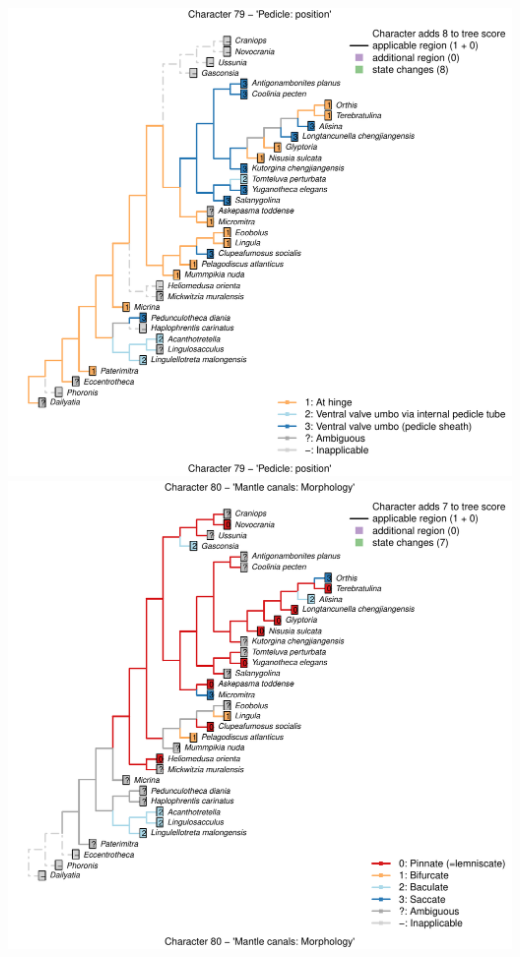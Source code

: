 \documentclass[]{book}
\theoremstyle{definition}
\theoremstyle{definition}
\theoremstyle{definition}
\theoremstyle{remark}
\begin{document}
\includegraphics{Brachiopod_phylogeny_files/figure-latex/unnamed-chunk-4-79.pdf}
\includegraphics{Brachiopod_phylogeny_files/figure-latex/unnamed-chunk-4-80.pdf}
\end{document}
